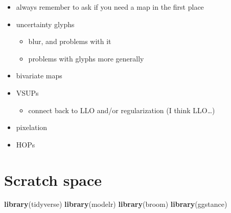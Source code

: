 \documentclass[]{book}
\newenvironment{Shaded}{\begin{snugshade}}{\end{snugshade}}
\newcommand{\KeywordTok}[1]{\textcolor[rgb]{0.13,0.29,0.53}{\textbf{#1}}}
\newcommand{\NormalTok}[1]{#1}
\providecommand{\tightlist}{%
  \setlength{\itemsep}{0pt}\setlength{\parskip}{0pt}}
\theoremstyle{definition}
\theoremstyle{definition}
\theoremstyle{definition}
\theoremstyle{remark}
\begin{document}
\begin{itemize}
\tightlist
\item
  always remember to ask if you need a map in the first place
\item
  uncertainty glyphs

  \begin{itemize}
  \tightlist
  \item
    blur, and problems with it
  \item
    problems with glyphs more generally
  \end{itemize}
\item
  bivariate maps
\item
  VSUPs

  \begin{itemize}
  \tightlist
  \item
    connect back to LLO and/or regularization (I think LLO\ldots{})
  \end{itemize}
\item
  pixelation
\item
  HOPs
\end{itemize}

\hypertarget{scratch-space}{%
\chapter*{Scratch space}\label{scratch-space}}

\begin{Shaded}
\begin{Highlighting}[]
\KeywordTok{library}\NormalTok{(tidyverse)}
\KeywordTok{library}\NormalTok{(modelr)}
\KeywordTok{library}\NormalTok{(broom)}
\KeywordTok{library}\NormalTok{(ggstance)}
\end{Highlighting}
\end{Shaded}
\end{document}

